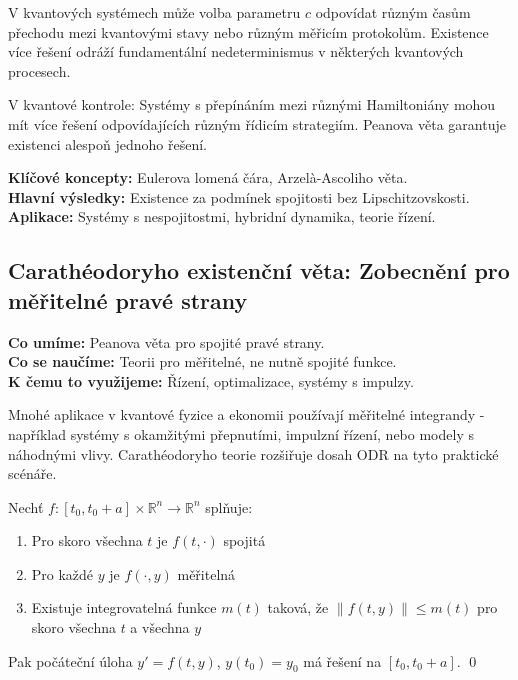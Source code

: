 \begin{keyinsight}
V kvantových systémech může volba parametru $c$ odpovídat různým časům přechodu mezi kvantovými stavy nebo různým měřicím protokolům. Existence více řešení odráží fundamentální nedeterminismus v některých kvantových procesech.
\end{keyinsight}

\begin{application}
V kvantové kontrole: Systémy s přepínáním mezi různými Hamiltoniány mohou mít více řešení odpovídajících různým řídicím strategiím. Peanova věta garantuje existenci alespoň jednoho řešení.
\end{application}

\begin{summary}
\textbf{Klíčové koncepty:} Eulerova lomená čára, Arzelà-Ascoliho věta. \\
\textbf{Hlavní výsledky:} Existence za podmínek spojitosti bez Lipschitzovskosti. \\
\textbf{Aplikace:} Systémy s nespojitostmi, hybridní dynamika, teorie řízení.
\end{summary}

\spc

\subsection{Carathéodoryho existenční věta: Zobecnění pro měřitelné pravé strany}

\begin{scaffold}
\textbf{Co umíme:} Peanova věta pro spojité pravé strany. \\
\textbf{Co se naučíme:} Teorii pro měřitelné, ne nutně spojité funkce. \\
\textbf{K čemu to využijeme:} Řízení, optimalizace, systémy s impulzy.
\end{scaffold}

\begin{motivation}
Mnohé aplikace v kvantové fyzice a ekonomii používají měřitelné integrandy - například systémy s okamžitými přepnutími, impulzní řízení, nebo modely s náhodnými vlivy. Carathéodoryho teorie rozšiřuje dosah ODR na tyto praktické scénáře.
\end{motivation}

\begin{theorem}
Nechť $f: [t_0, t_0+a] \times \mathbb{R}^n \to \mathbb{R}^n$ splňuje:
\begin{enumerate}
\item Pro skoro všechna $t$ je $f(t,\cdot)$ spojitá
\item Pro každé $y$ je $f(\cdot,y)$ měřitelná
\item Existuje integrovatelná funkce $m(t)$ taková, že $\|f(t,y)\| \leq m(t)$ pro skoro všechna $t$ a všechna $y$
\end{enumerate}
Pak počáteční úloha $y' = f(t,y)$, $y(t_0) = y_0$ má řešení na $[t_0, t_0+a]$.
\qed
\end{theorem}

